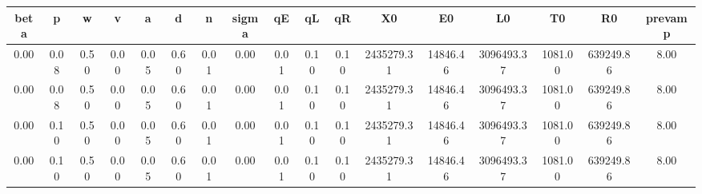 \begin{tiny}\begin{tabular}{|c|c|c|c|c|c|c|c|c|c|c|c|c|c|c|c|c|}
\hline
\textbf{beta}&\textbf{p}&\textbf{w}&\textbf{v}&\textbf{a}&\textbf{d}&\textbf{n}&\textbf{sigma}&\textbf{qE}&\textbf{qL}&\textbf{qR}&\textbf{X0}&\textbf{E0}&\textbf{L0}&\textbf{T0}&\textbf{R0}&\textbf{prevamp}\\\hline
0.00&0.08&0.50&0.00&0.05&0.60&0.01&0.00&0.01&0.10&0.10&2435279.31&14846.46&3096493.37&1081.00&639249.86&8.00\\\hline
0.00&0.08&0.50&0.00&0.05&0.60&0.01&0.00&0.01&0.10&0.10&2435279.31&14846.46&3096493.37&1081.00&639249.86&8.00\\\hline
0.00&0.10&0.50&0.00&0.05&0.60&0.01&0.00&0.01&0.10&0.10&2435279.31&14846.46&3096493.37&1081.00&639249.86&8.00\\\hline
0.00&0.10&0.50&0.00&0.05&0.60&0.01&0.00&0.01&0.10&0.10&2435279.31&14846.46&3096493.37&1081.00&639249.86&8.00\\\hline
\end{tabular}
\end{tiny}